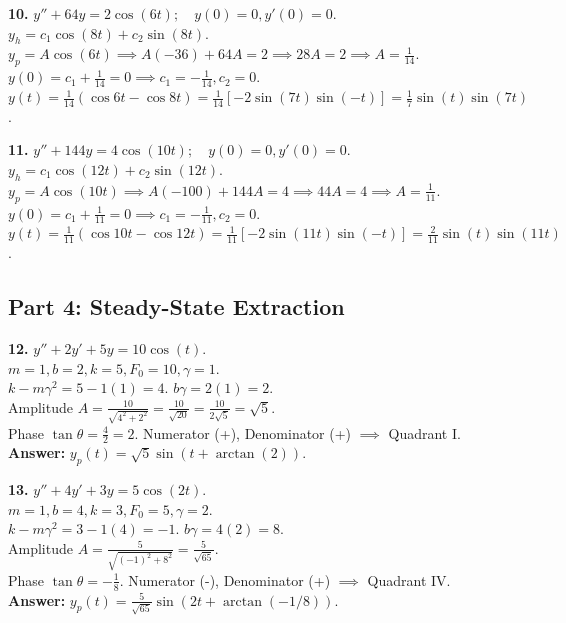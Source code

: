 \documentclass[11pt]{article}
\begin{document}
\vspace{0.5cm}
\textbf{10.} $y'' + 64y = 2\cos(6t); \quad y(0) = 0, y'(0) = 0$. \\
$y_h = c_1 \cos(8t) + c_2 \sin(8t)$. \\
$y_p = A \cos(6t) \implies A(-36) + 64A = 2 \implies 28A = 2 \implies A = \frac{1}{14}$. \\
$y(0) = c_1 + \frac{1}{14} = 0 \implies c_1 = -\frac{1}{14}, c_2 = 0$. \\
$y(t) = \frac{1}{14}(\cos 6t - \cos 8t) = \frac{1}{14} \left[ -2 \sin(7t) \sin(-t) \right] = \frac{1}{7} \sin(t) \sin(7t)$.

\vspace{0.5cm}
\textbf{11.} $y'' + 144y = 4\cos(10t); \quad y(0) = 0, y'(0) = 0$. \\
$y_h = c_1 \cos(12t) + c_2 \sin(12t)$. \\
$y_p = A \cos(10t) \implies A(-100) + 144A = 4 \implies 44A = 4 \implies A = \frac{1}{11}$. \\
$y(0) = c_1 + \frac{1}{11} = 0 \implies c_1 = -\frac{1}{11}, c_2 = 0$. \\
$y(t) = \frac{1}{11}(\cos 10t - \cos 12t) = \frac{1}{11} \left[ -2 \sin(11t) \sin(-t) \right] = \frac{2}{11} \sin(t) \sin(11t)$.

\subsection*{Part 4: Steady-State Extraction}

\textbf{12.} $y'' + 2y' + 5y = 10 \cos(t)$. \\
$m=1, b=2, k=5, F_0=10, \gamma=1$. \\
$k - m\gamma^2 = 5 - 1(1) = 4$. $b\gamma = 2(1) = 2$. \\
Amplitude $A = \frac{10}{\sqrt{4^2 + 2^2}} = \frac{10}{\sqrt{20}} = \frac{10}{2\sqrt{5}} = \sqrt{5}$. \\
Phase $\tan \theta = \frac{4}{2} = 2$. Numerator (+), Denominator (+) $\implies$ Quadrant I. \\
\textbf{Answer:} $y_p(t) = \sqrt{5} \sin(t + \arctan(2))$.

\vspace{0.5cm}
\textbf{13.} $y'' + 4y' + 3y = 5 \cos(2t)$. \\
$m=1, b=4, k=3, F_0=5, \gamma=2$. \\
$k - m\gamma^2 = 3 - 1(4) = -1$. $b\gamma = 4(2) = 8$. \\
Amplitude $A = \frac{5}{\sqrt{(-1)^2 + 8^2}} = \frac{5}{\sqrt{65}}$. \\
Phase $\tan \theta = -\frac{1}{8}$. Numerator (-), Denominator (+) $\implies$ Quadrant IV. \\
\textbf{Answer:} $y_p(t) = \frac{5}{\sqrt{65}} \sin(2t + \arctan(-1/8))$.
\end{document}
